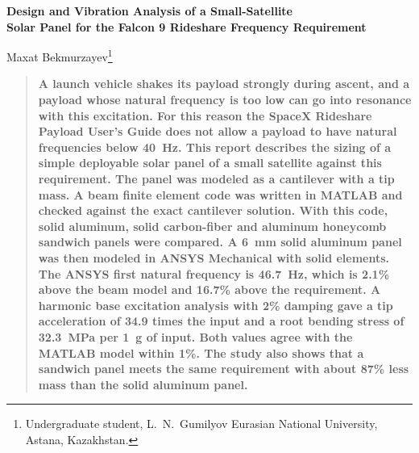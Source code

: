 \documentclass[letterpaper,10pt]{article}
\begin{document}
\begin{center}
{\LARGE\bfseries Design and Vibration Analysis of a Small-Satellite\\[2pt]
Solar Panel for the Falcon 9 Rideshare Frequency Requirement\par}
\vspace{12pt}
{\large Maxat Bekmurzayev\footnote{Undergraduate student, L.~N.~Gumilyov Eurasian National University, Astana, Kazakhstan.}\par}
\end{center}

\vspace{6pt}
\begin{quote}
\bfseries
A launch vehicle shakes its payload strongly during ascent, and a payload whose
natural frequency is too low can go into resonance with this excitation. For this
reason the SpaceX Rideshare Payload User's Guide does not allow a payload to have
natural frequencies below 40~Hz. This report describes the sizing of a simple
deployable solar panel of a small satellite against this requirement. The panel was
modeled as a cantilever with a tip mass. A beam finite element code was written in
MATLAB and checked against the exact cantilever solution. With this code, solid
aluminum, solid carbon-fiber and aluminum honeycomb sandwich panels were compared.
A 6~mm solid aluminum panel was then modeled in ANSYS Mechanical with solid
elements. The ANSYS first natural frequency is 46.7~Hz, which is 2.1\% above the
beam model and 16.7\% above the requirement. A harmonic base excitation analysis
with 2\% damping gave a tip acceleration of 34.9 times the input and a root bending
stress of 32.3~MPa per 1~g of input. Both values agree with the MATLAB model within
1\%. The study also shows that a sandwich panel meets the same requirement with
about 87\% less mass than the solid aluminum panel.
\end{quote}

\end{document}
